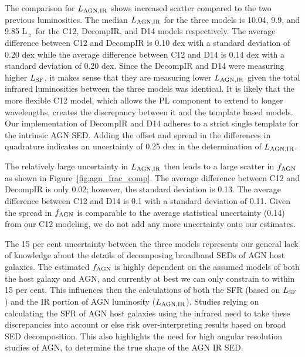 \documentclass[fleqn, usenatbib]{mnras}
\newcommand{\lsun}{L$_{\sun}$}
\begin{document}
The comparison for $L_{\rm AGN, IR}$ shows increased scatter compared to the two previous luminosities. The median $L_{\rm AGN, IR}$ for the three models is 10.04, 9.9, and 9.85 \lsun{} for the C12, DecompIR, and D14 models respectively. The average difference between C12 and DecompIR is 0.10 dex with a standard deviation of 0.20 dex while the average difference between C12 and D14 is 0.14 dex with a standard deviation of 0.20 dex. Since the DecompIR and D14 were measuring higher $L_{\rm SF}$, it makes sense that they are measuring lower $L_{\rm AGN, IR}$ given the total infrared luminosities between the three models was identical. It is likely that the more flexible C12 model, which allows the PL component to extend to longer wavelengths, creates the discrepancy between it and the template based models. Our implementation of DecompIR and D14 adheres to a strict single template for the intrinsic AGN SED. Adding the offset and spread in the differences in quadrature indicates an uncertainty of 0.25 dex in the determination of $L_{\rm AGN, IR}$. 

The relatively large uncertainty in $L_{\rm AGN, IR}$ then leads to a large scatter in $f_{\rm AGN}$ as shown in Figure~\ref{fig:agn_frac_comp}. The average difference between C12 and DecompIR is only 0.02; however, the standard deviation is 0.13. The average difference between C12 and D14 is 0.1 with a standard deviation of 0.11. Given the spread in $f_{\rm AGN}$ is comparable to the average statistical uncertainty (0.14) from our C12 modeling, we do not add any more uncertainty onto our estimates. 

The 15 per cent uncertainty between the three models represents our general lack of knowledge about the details of decomposing broadband SEDs of AGN host galaxies. The estimated $f_{\rm AGN}$ is highly dependent on the assumed models of both the host galaxy and AGN, and currently at best we can only constrain to within 15 per cent. This influences then the calculations of both the SFR (based on $L_{\rm SF}$) and the IR portion of AGN luminosity ($L_{\rm AGN, IR}$). Studies relying on calculating the SFR of AGN host galaxies using the infrared need to take these discrepancies into account or else risk over-interpreting results based on broad SED decomposition. This also highlights the need for high angular resolution studies of AGN, to determine the true shape of the AGN IR SED.
\end{document}
